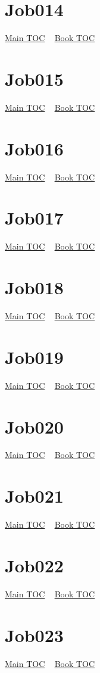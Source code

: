 \documentclass{book}
\begin{document}
  \section{Job014}\hyperlink{toc}{Main TOC} ~ \hyperref[subsec:Job]{Book TOC} 
  \section{Job015}\hyperlink{toc}{Main TOC} ~ \hyperref[subsec:Job]{Book TOC} 
  \section{Job016}\hyperlink{toc}{Main TOC} ~ \hyperref[subsec:Job]{Book TOC} 
  \section{Job017}\hyperlink{toc}{Main TOC} ~ \hyperref[subsec:Job]{Book TOC} 
  \section{Job018}\hyperlink{toc}{Main TOC} ~ \hyperref[subsec:Job]{Book TOC} 
  \section{Job019}\hyperlink{toc}{Main TOC} ~ \hyperref[subsec:Job]{Book TOC} 
  \section{Job020}\hyperlink{toc}{Main TOC} ~ \hyperref[subsec:Job]{Book TOC} 
  \section{Job021}\hyperlink{toc}{Main TOC} ~ \hyperref[subsec:Job]{Book TOC} 
  \section{Job022}\hyperlink{toc}{Main TOC} ~ \hyperref[subsec:Job]{Book TOC} 
  \section{Job023}\hyperlink{toc}{Main TOC} ~ \hyperref[subsec:Job]{Book TOC} 
\end{document}
